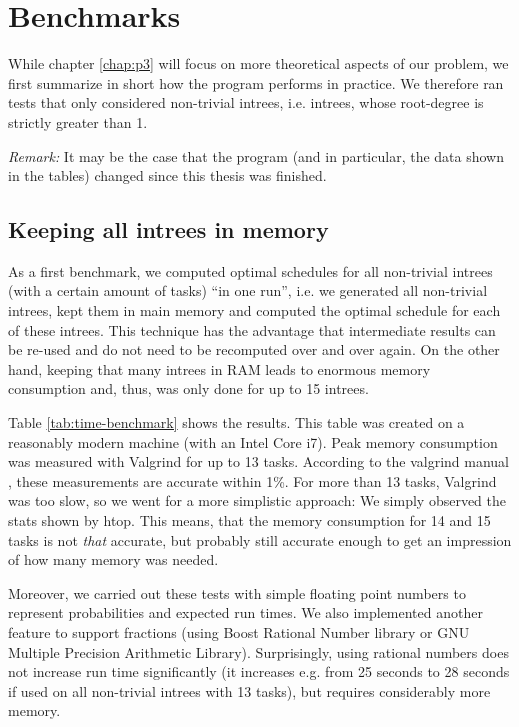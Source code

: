 \chapter{Benchmarks}
\label{chap:benchmarks}

While chapter \ref{chap:p3} will focus on more theoretical aspects of our problem, we first summarize in short how the program performs in practice. We therefore ran tests that only considered non-trivial intrees, i.e. intrees, whose root-degree is strictly greater than 1.

\emph{Remark:} It may be the case that the program (and in particular, the data shown in the tables) changed since this thesis was finished.

\section{Keeping all intrees in memory}
\label{sec:benchmarks-all-intrees-in-memory}

As a first benchmark, we computed optimal schedules for all non-trivial intrees (with a certain amount of tasks) ``in one run'', i.e. we generated all non-trivial intrees, kept them in main memory and computed the optimal schedule for each of these intrees. This technique has the advantage that intermediate results can be re-used and do not need to be recomputed over and over again. On the other hand, keeping that many intrees in RAM leads to enormous memory consumption and, thus, was only done for up to 15 intrees.

Table \ref{tab:time-benchmark} shows the results. This table was created on a reasonably modern machine (with an Intel Core i7). Peak memory consumption was measured with Valgrind for up to 13 tasks. According to the valgrind manual \cite{massifmanual}, these measurements are accurate within 1\%. For more than 13 tasks, Valgrind was too slow, so we went for a more simplistic approach: We simply observed the stats shown by htop. This means, that the memory consumption for 14 and 15 tasks is not \emph{that} accurate, but probably still accurate enough to get an impression of how many memory was needed.

Moreover, we carried out these tests with simple floating point numbers to represent probabilities and expected run times. We also implemented another feature to support fractions (using Boost Rational Number library or GNU Multiple Precision Arithmetic Library). Surprisingly, using rational numbers does not increase run time significantly (it increases e.g. from 25 seconds to 28 seconds if used on all non-trivial intrees with 13 tasks), but requires considerably more memory.


